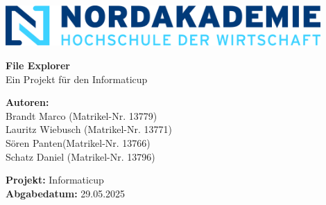 \begin{titlepage}
	\begin{center}

		\includegraphics[width=0.9\textwidth]{images/Nordakademie_Logo.png}
		\vspace{1cm}

		\huge
		\textbf{File Explorer}\\
		Ein Projekt für den Informaticup
		\vspace{0.5cm}

		\large

		\vspace{1.5cm}
		\textbf{Autoren:}\\
		Brandt Marco (Matrikel-Nr. 13779)\\
		Lauritz Wiebusch (Matrikel-Nr. 13771)\\
		Sören Panten(Matrikel-Nr. 13766)\\
		Schatz Daniel (Matrikel-Nr. 13796)

		\vspace{1cm}
		\textbf{Projekt:} Informaticup\\
		\textbf{Abgabedatum:} 29.05.2025

		\vfill

	\end{center}

\end{titlepage}
